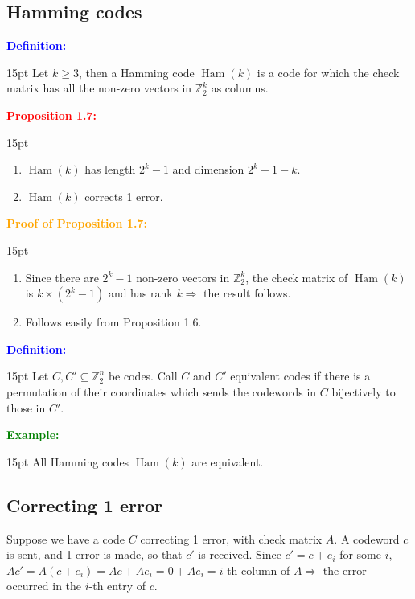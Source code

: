 \documentclass[12pt]{article}
\newcommand{\noparskip}{\vspace{-\parskip}}
\newenvironment{points}
	{\begin{enumerate}[label = (\arabic*)]}
	{\end{enumerate}}
\newenvironment{dent}
	{\begin{adjustwidth}{15pt}{}\noparskip}
	{\end{adjustwidth}}
\newenvironment{result}[1]
	{\textcolor{Red}{\textbf{#1:}}\begin{dent}}
	{\end{dent}}
\newenvironment{proof}[1]
	{\textcolor{Orange}{\textbf{Proof of #1:}}\begin{dent}}
	{\end{dent}}
\newenvironment{definition}
	{\textcolor{Blue}{\textbf{Definition:}}\begin{dent}}
	{\end{dent}}
\newenvironment{example}
	{\textcolor{Green}{\textbf{Example:}}\begin{dent}}
	{\end{dent}}
\renewcommand{\implies}{\Rightarrow}
\newcommand{\Z}{\mathbb{Z}}
\newcommand{\Ham}[1]{\operatorname{Ham}(#1)}
\begin{document}
\subsection{Hamming codes}

\begin{definition}
Let $k \ge 3$, then a Hamming code $\Ham{k}$ is a code for which the check matrix has all the non-zero vectors in $\Z_2^k$ as columns.
\end{definition}

\begin{result}{Proposition 1.7}
\begin{points}
\item $\Ham{k}$ has length $2^k - 1$ and dimension $2^k - 1 - k$.
\item $\Ham{k}$ corrects 1 error.
\end{points}
\end{result}

\begin{proof}{Proposition 1.7}
\begin{points}
\item Since there are $2^k - 1$ non-zero vectors in $\Z_2^k$, the check matrix of $\Ham{k}$ is $k \times (2^k - 1)$ and has rank $k \implies$ the result follows.
\item Follows easily from Proposition 1.6.
\end{points}
\end{proof}

\begin{definition}
Let $C, C' \subseteq \Z_2^n$ be codes. Call $C$ and $C'$ equivalent codes if there is a permutation of their coordinates which sends the codewords in $C$ bijectively to those in $C'$.
\end{definition}

\begin{example}
All Hamming codes $\Ham{k}$ are equivalent.
\end{example}

\subsection{Correcting 1 error}

Suppose we have a code $C$ correcting 1 error, with check matrix $A$. A codeword $c$ is sent, and 1 error is made, so that $c'$ is received. Since $c' = c + e_i$ for some $i$, $Ac' = A(c + e_i) = Ac + Ae_i = 0 + Ae_i = i$-th column of $A \implies$ the error occurred in the $i$-th entry of $c$.
\end{document}

